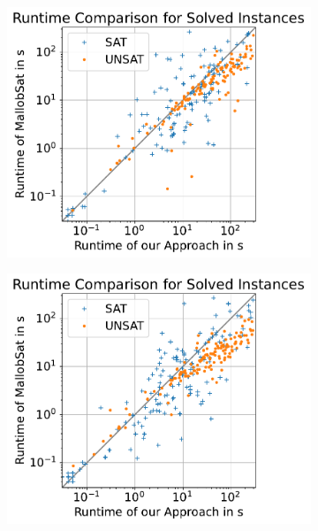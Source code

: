 \documentclass[12pt,a4paper,twoside]{scrartcl}
\numberwithin{equation}{section}
\begin{document}
\begin{figure}[!h]
  \center
  \begin{subfigure}[c]{.45\textwidth}
    \center
    \includegraphics[scale=.45]{plots/square_runtime_compare/square_runtime_1node.pdf}
    \label{fig:runtimeCompare1node}
  \end{subfigure}
  \begin{subfigure}[c]{.45\textwidth}
    \center
    \includegraphics[scale=.45]{plots/square_runtime_compare/square_runtime_4node.pdf}
    \label{fig:runtimeCompare4node}

\end{subfigure}
\end{figure}
\end{document}
